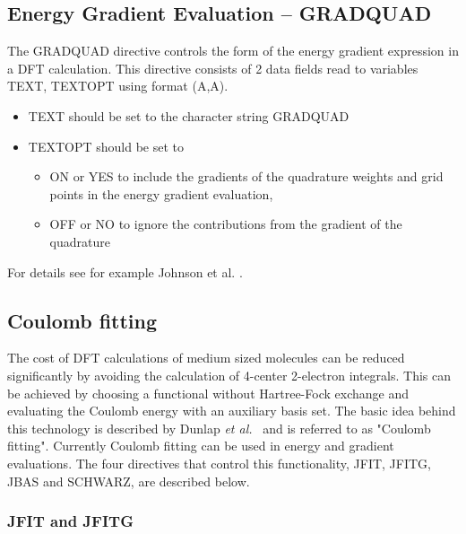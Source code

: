 \documentclass[11pt,fleqn]{article}
\begin{document}
\subsection[Energy Gradient Evaluation -- GRADQUAD]{Energy Gradient Evaluation -- GRADQUAD}

The GRADQUAD directive controls the form of the energy gradient expression in
a DFT calculation. This directive consists of 2 data fields read to variables 
TEXT, TEXTOPT using format (A,A).
\begin{itemize}
\item TEXT should be set to the character string GRADQUAD 
\item TEXTOPT should be set to 
   \begin{itemize}
   \item ON or YES to include the gradients of the quadrature weights and 
         grid points in the energy gradient evaluation,
   \item OFF or NO to ignore the contributions from the gradient of the 
         quadrature
   \end{itemize}
\end{itemize}
For details see for example Johnson et al. \cite{johnson93}.

\subsection[Coulomb fitting]{Coulomb fitting}

The cost of DFT calculations of medium sized molecules can be reduced
significantly by avoiding the calculation of 4-center 2-electron
integrals.  This can be achieved by choosing a functional without
Hartree-Fock exchange and evaluating the Coulomb energy with an
auxiliary basis set. The basic idea behind this technology is
described by Dunlap {\it et al.}~\cite{dunlap79} and is referred to as
"Coulomb fitting".  Currently Coulomb fitting can be used in energy and
gradient evaluations. The four directives that control this functionality,
JFIT, JFITG, JBAS and SCHWARZ, are described below.

\subsubsection[JFIT and JFITG]{JFIT and JFITG}
\end{document}
